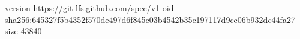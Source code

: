version https://git-lfs.github.com/spec/v1
oid sha256:645327f5b4352f570de497d6f845c03b4542b35c197117d9cc06b932dc44fa27
size 43840
